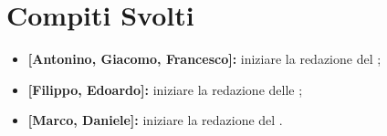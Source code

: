 \documentclass[../verbale-2016-12-14.tex]{subfiles}
\begin{document}
	\section{Compiti Svolti}
	\begin{itemize}
		\item \textbf{[Antonino, Giacomo, Francesco]:} iniziare la redazione del \pianodiprogetto;
		\item \textbf{[Filippo, Edoardo]:} iniziare la redazione delle \normediprogetto;
		\item \textbf{[Marco, Daniele]:} iniziare la redazione del \pianodiqualifica.
	\end{itemize}
\end{document}
